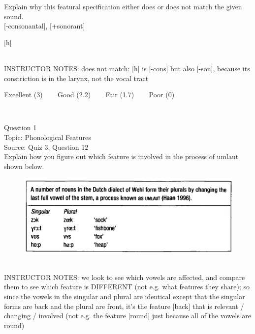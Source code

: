 \documentclass[12pt]{article}
\begin{document}
Explain why this featural specification either does or does not match the given sound.\\

{[-consonantal]}, {[+sonorant]}

{[h]}


~\\
INSTRUCTOR NOTES: does not match: [h] is [-cons] but also [-son], because its constriction is in the larynx, not the vocal tract


\vfill
Excellent (3) ~~~ Good (2.2) ~~~ Fair (1.7) ~~~ Poor (0)
\newpage

\begin{center}
\textbf{{\color{red}{\HUGE END OF EXAM}}}\\

\end{center}
\newpage

\begin{center}
\textbf{{\color{blue}{\HUGE START OF EXAM\\}}}

\textbf{{\color{blue}{\HUGE Student ID: 17357\\}}}

\textbf{{\color{blue}{\HUGE 9:10\\}}}

\end{center}
\newpage

{\large Question 1}\\

Topic: Phonological Features\\
Source: Quiz 3, Question 12\\

Explain how you figure out which feature is involved in the process of umlaut shown below.\\

\begin{figure}[H]
\includegraphics{../images/dutch.png}
\end{figure}

~\\
INSTRUCTOR NOTES: we look to see which vowels are affected, and compare them to see which feature is DIFFERENT (not e.g. what features they share); so since the vowels in the singular and plural are identical except that the singular forms are back and the plural are front, it's the feature [back] that is relevant / changing / involved (not e.g. the feature [round] just because all of the vowels are round)
\end{document}
